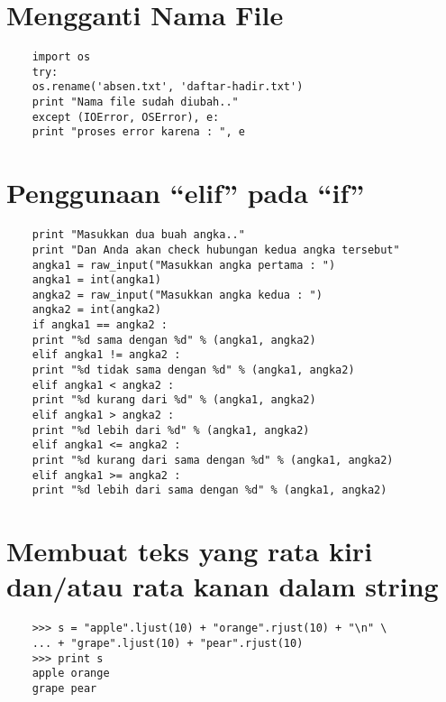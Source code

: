 \documentclass[12pt]{article} %
\begin{document}
\section {Mengganti Nama File}
\begin{lstlisting}
	import os
	try:
	os.rename('absen.txt', 'daftar-hadir.txt')
	print "Nama file sudah diubah.."
	except (IOError, OSError), e:
	print "proses error karena : ", e

\end{lstlisting}

\section {Penggunaan “elif” pada “if”}
\begin{lstlisting}
	print "Masukkan dua buah angka.."
	print "Dan Anda akan check hubungan kedua angka tersebut"
	angka1 = raw_input("Masukkan angka pertama : ")
	angka1 = int(angka1)
	angka2 = raw_input("Masukkan angka kedua : ")
	angka2 = int(angka2)
	if angka1 == angka2 :
	print "%d sama dengan %d" % (angka1, angka2)
	elif angka1 != angka2 :
	print "%d tidak sama dengan %d" % (angka1, angka2)
	elif angka1 < angka2 :
	print "%d kurang dari %d" % (angka1, angka2)
	elif angka1 > angka2 :
	print "%d lebih dari %d" % (angka1, angka2)
	elif angka1 <= angka2 :
	print "%d kurang dari sama dengan %d" % (angka1, angka2)
	elif angka1 >= angka2 :
	print "%d lebih dari sama dengan %d" % (angka1, angka2)

\end{lstlisting}

\section {Membuat teks yang rata kiri dan/atau rata kanan dalam string}
\begin{lstlisting}
	>>> s = "apple".ljust(10) + "orange".rjust(10) + "\n" \
	... + "grape".ljust(10) + "pear".rjust(10)
	>>> print s
	apple orange
	grape pear
\end{lstlisting}
\end{document}
